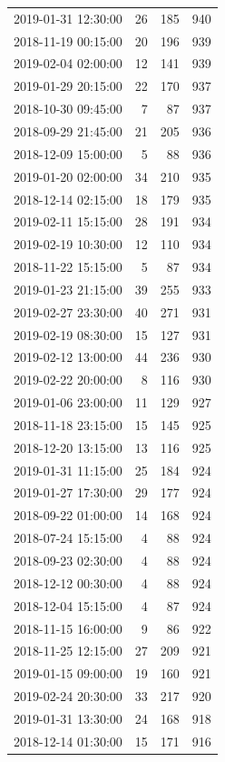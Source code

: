 \begin{tabular}{lrrr}
2019-01-31 12:30:00 & 26 & 185 & 940 \\
2018-11-19 00:15:00 & 20 & 196 & 939 \\
2019-02-04 02:00:00 & 12 & 141 & 939 \\
2019-01-29 20:15:00 & 22 & 170 & 937 \\
2018-10-30 09:45:00 & 7 & 87 & 937 \\
2018-09-29 21:45:00 & 21 & 205 & 936 \\
2018-12-09 15:00:00 & 5 & 88 & 936 \\
2019-01-20 02:00:00 & 34 & 210 & 935 \\
2018-12-14 02:15:00 & 18 & 179 & 935 \\
2019-02-11 15:15:00 & 28 & 191 & 934 \\
2019-02-19 10:30:00 & 12 & 110 & 934 \\
2018-11-22 15:15:00 & 5 & 87 & 934 \\
2019-01-23 21:15:00 & 39 & 255 & 933 \\
2019-02-27 23:30:00 & 40 & 271 & 931 \\
2019-02-19 08:30:00 & 15 & 127 & 931 \\
2019-02-12 13:00:00 & 44 & 236 & 930 \\
2019-02-22 20:00:00 & 8 & 116 & 930 \\
2019-01-06 23:00:00 & 11 & 129 & 927 \\
2018-11-18 23:15:00 & 15 & 145 & 925 \\
2018-12-20 13:15:00 & 13 & 116 & 925 \\
2019-01-31 11:15:00 & 25 & 184 & 924 \\
2019-01-27 17:30:00 & 29 & 177 & 924 \\
2018-09-22 01:00:00 & 14 & 168 & 924 \\
2018-07-24 15:15:00 & 4 & 88 & 924 \\
2018-09-23 02:30:00 & 4 & 88 & 924 \\
2018-12-12 00:30:00 & 4 & 88 & 924 \\
2018-12-04 15:15:00 & 4 & 87 & 924 \\
2018-11-15 16:00:00 & 9 & 86 & 922 \\
2018-11-25 12:15:00 & 27 & 209 & 921 \\
2019-01-15 09:00:00 & 19 & 160 & 921 \\
2019-02-24 20:30:00 & 33 & 217 & 920 \\
2019-01-31 13:30:00 & 24 & 168 & 918 \\
2018-12-14 01:30:00 & 15 & 171 & 916 \\

\end{tabular}
